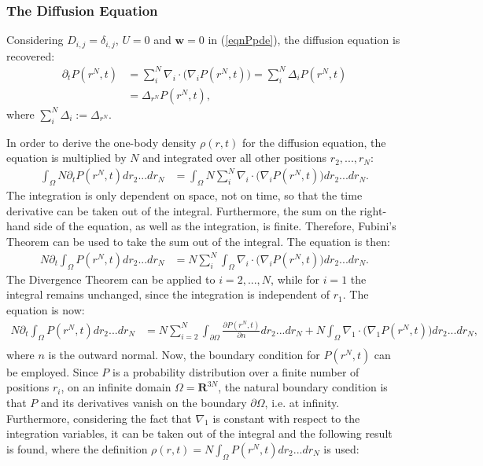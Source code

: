 \subsubsection{The Diffusion Equation}
Considering $D_{i,j}=\delta_{i,j}$, $U=0$ and $\mathbf{w}=0$ in (\ref{eqnPpde}), the diffusion equation is recovered:
\begin{align*} 
\partial_t P(r^N,t) &= \sum_{i}^N \nabla_i \cdot \bigg(\nabla_i   P(r^N,t) \bigg)= \sum_{i}^N \Delta_i P(r^N,t)\\
&= \Delta_{r^N} P(r^N,t),
\end{align*}
where $\sum_{i}^N \Delta_i := \Delta_{r^N}$.

In order to derive the one-body density $\rho(r,t)$ for the diffusion equation, the equation is multiplied by $N$ and integrated over all other positions $r_2,...,r_N$:
\begin{align*} 
\int_\Omega N \partial_t P(r^N,t)dr_2...dr_N &= \int_\Omega N \sum_{i}^N \nabla_i \cdot \bigg(\nabla_i   P(r^N,t) \bigg)dr_2...dr_N.
\end{align*}
The integration is only dependent on space, not on time, so that the time derivative can be taken out of the integral. Furthermore, the sum on the right-hand side of the equation, as well as the integration, is finite. Therefore, Fubini's Theorem can be used to take the sum out of the integral. The equation is then:
\begin{align*} 
N \partial_t \int_\Omega P(r^N,t)dr_2...dr_N &=N \sum_{i}^N \int_\Omega  \nabla_i \cdot \bigg(\nabla_i   P(r^N,t) \bigg)dr_2...dr_N.
\end{align*}
The Divergence Theorem can be applied to $i=2,...,N$, while for $i=1$ the integral remains unchanged, since the integration is independent of $r_1$. The equation is now:
\begin{align*} 
N \partial_t \int_\Omega P(r^N,t)dr_2...dr_N &=N \sum_{i=2}^N \int_{\partial \Omega} \frac{\partial P(r^N,t)}{\partial n} dr_2...dr_N + N\int_\Omega \nabla_1 \cdot \bigg(\nabla_1   P(r^N,t) \bigg)dr_2...dr_N,\\
\end{align*}
where $n$ is the outward normal. 
Now, the boundary condition for $P(r^N,t)$ can be employed. Since $P$ is a probability distribution over a finite number of positions $r_i$, on an infinite domain $\Omega= \mathbf{R}^{3N}$, the natural boundary condition is that $P$ and its derivatives vanish on the boundary $\partial \Omega$, i.e. at infinity.
Furthermore, considering the fact that $\nabla_1$ is constant with respect to the integration variables, it can be taken out of the integral and the following result is found, where the definition $\rho(r,t)= N \int_\Omega P(r^N,t)dr_2...dr_N$ is used:
